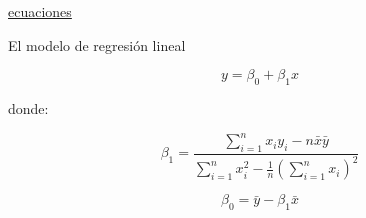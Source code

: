 
\href{https://es.wikipedia.org/wiki/Regresi%C3%B3n_lineal}{ecuaciones}



El modelo de regresión lineal

\[
y = \beta_0 + \beta_1 x
\]

donde:

\[
\beta_1 = \frac{\sum_{i=1}^n x_iy_i - n \bar{x}\bar{y}}{\sum_{i=1}^n x_i^2 - \frac{1}{n}(\sum_{i=1}^n x_i)^2}
\]

\[
\beta_0= \bar{y} - \beta_1 \bar{x}
\]






